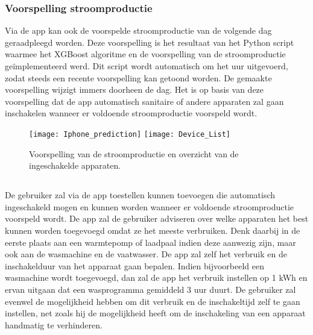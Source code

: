 \subsubsection{Voorspelling stroomproductie}

Via de app kan ook de voorspelde stroomproductie van de volgende dag geraadpleegd worden. Deze voorspelling is het resultaat van het Python script waarmee het XGBoost algoritme en de voorspelling van de stroomproductie geïmplementeerd werd. Dit script wordt automatisch om het uur uitgevoerd, zodat steeds een recente voorspelling kan getoond worden. De gemaakte voorspelling wijzigt immers doorheen de dag. Het is op basis van deze voorspelling dat de app automatisch sanitaire of andere apparaten zal gaan inschakelen wanneer er voldoende stroomproductie voorspeld wordt. 

\begin{figure}[h!]
    \centering
    \texttt{[image: Iphone\_prediction]} \hspace{0.5cm}
    \texttt{[image: Device\_List]}
    \caption{Voorspelling van de stroomproductie en overzicht van de ingeschakelde apparaten.}
\end{figure}

\newpage
\subsection{}%
\label{sec:Aansturing slimme stekkers aansturen op basis van de voorspelde stroomproductie}

De gebruiker zal via de app toestellen kunnen toevoegen die automatisch ingeschakeld mogen en kunnen worden wanneer er voldoende stroomproductie voorspeld wordt. De app zal de gebruiker adviseren over welke apparaten het best kunnen worden toegevoegd omdat ze het meeste verbruiken. Denk daarbij in de eerste plaats aan een warmtepomp of laadpaal indien deze aanwezig zijn, maar ook aan de wasmachine en de vaatwasser. De app zal zelf het verbruik en de inschakelduur van het apparaat gaan bepalen. Indien bijvoorbeeld een wasmachine wordt toegevoegd, dan zal de app het verbruik instellen op 1 kWh en ervan uitgaan dat een wasprogramma gemiddeld 3 uur duurt. De gebruiker zal evenwel de mogelijkheid hebben om dit verbruik en de inschakeltijd zelf te gaan instellen, net zoals hij de mogelijkheid heeft om de inschakeling van een apparaat handmatig te verhinderen.\\

